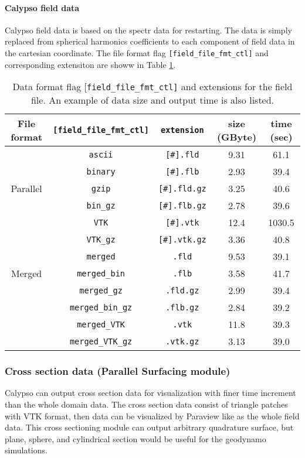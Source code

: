 \paragraph{Calypso field data}
Calypso field data is based on the spectr data for restarting. The data is simply replaced from spherical harmonics coefficients to each component of field data in the cartesian coordinate. The file format flag \verb|[field_file_fmt_ctl]| and corresponding extensiton are showw in Table \ref{table:field_format}.
%
%
\begin{table}[htp]
\caption{Data format flag {[\tt field\_file\_fmt\_ctl]} and extensions for the field file. An example of data size and output time is also listed.}
\begin{center} 
\begin{tabular}{|c|c|c|c|c|}
\hline
File format & \verb|[field_file_fmt_ctl]|  & \verb|extension| & size (GByte) & time (sec)  \\ \hline \hline
              &  \verb|ascii| & \verb|[#].fld|  & 9.31 & 61.1 \\
              &  \verb|binary| & \verb|[#].flb|  & 2.93 & 39.4  \\
Parallel  &  \verb|gzip| &  \verb|[#].fld.gz| & 3.25 &  40.6 \\
              &  \verb|bin_gz| &\verb|[#].flb.gz| & 2.78 &  39.6\\
              &  \verb|VTK| & \verb|[#].vtk|  & 12.4 & 1030.5 \\
              &  \verb|VTK_gz| & \verb|[#].vtk.gz|  & 3.36 & 40.8 \\ \hline
              & \verb|merged|  &  \verb|.fld| & 9.53 & 39.1 \\
 Merged &  \verb|merged_bin| &  \verb|.flb| & 3.58 & 41.7  \\
              &  \verb|merged_gz| &  \verb|.fld.gz| & 2.99 &  39.4  \\
              &  \verb|merged_bin_gz| &  \verb|.flb.gz| & 2.84 &  39.2 \\
              &  \verb|merged_VTK| & \verb|.vtk|  & 11.8 & 39.3 \\
              &  \verb|merged_VTK_gz| & \verb|.vtk.gz|  & 3.13 & 39.0 \\  \hline
\end{tabular}
\end{center}
\label{table:field_format}
\end{table}
%

%
\subsubsection{Cross section data (Parallel Surfacing module)}
\label{section:PSF}
Calypso can output cross section data for visualization with finer time increment than the whole domain data. The cross section data consist of triangle patches with VTK format, then data can be visualized by Paraview like as the whole field data. This cross sectioning module can output arbitrary quadrature surface, but plane, sphere, and cylindrical section would be useful for the geodynamo simulations.

